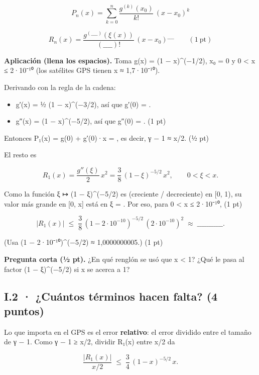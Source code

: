 \[P_n(x) = \sum_{k=0}^{n} \frac{g^{(k)}(x_0)}{k!}\,(x-x_0)^k \]

\[R_n(x) = \frac{g^{(\_\_\_\_)}(\xi(x))}{(\_\_\_\_)!}\,(x-x_0)^{\_\_\_\_} \qquad (1\ \text{pt})\]

\textbf{Aplicación (llena los espacios).} Toma g(x) = (1 − x)\^{}(−1/2), x₀ = 0 y 0 \textless{} x ≤ 2·10⁻¹⁰ (los satélites GPS tienen x ≈ 1,7·10⁻¹⁰).

Derivando con la regla de la cadena:

\begin{itemize}
\tightlist
\item
  g′(x) = ½ (1 − x)\^{}(−3/2), así que g′(0) =  .
\item
  g″(x) =  (1 − x)\^{}(−5/2), así que g″(0) =  . (1 pt)
\end{itemize}

Entonces P₁(x) = g(0) + g′(0)·x =  , es decir, γ − 1 ≈ x/2. (½ pt)

El resto es

\[R_1(x) = \frac{g''(\xi)}{2}\,x^2 = \frac{3}{8}\,(1-\xi)^{-5/2}\,x^2, \qquad 0 < \xi < x .\]

Como la función ξ ↦ (1 − ξ)\^{}(−5/2) es  (creciente / decreciente) en {[}0, 1), su valor más grande en {[}0, x{]} está en ξ =  . Por eso, para 0 \textless{} x ≤ 2·10⁻¹⁰, (1 pt)

\[|R_1(x)| \;\le\; \frac{3}{8}\,(1-2\cdot 10^{-10})^{-5/2}\,(2\cdot 10^{-10})^2 \;\approx\; \_\_\_\_\_\_\_\_\_\_\_ .\]

(Usa (1 − 2·10⁻¹⁰)\^{}(−5/2) ≈ 1,0000000005.) (1 pt)

\textbf{Pregunta corta (½ pt).} ¿En qué renglón se usó que x \textless{} 1? ¿Qué le pasa al factor (1 − ξ)\^{}(−5/2) si x se acerca a 1?


\subsection{I.2 · ¿Cuántos términos hacen falta? (4 puntos)}

Lo que importa en el GPS es el error \textbf{relativo}: el error dividido entre el tamaño de γ − 1. Como γ − 1 ≥ x/2, dividir \textbar R₁(x)\textbar{} entre x/2 da

\[\frac{|R_1(x)|}{x/2} \;\le\; \frac{3}{4}\,(1-x)^{-5/2}\,x .\]

